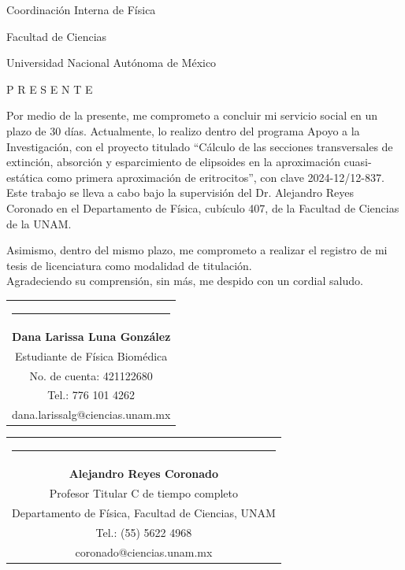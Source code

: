 \documentclass[9pt,letterpaper]{article}
\begin{document}
	Coordinación Interna de Física 
	
	Facultad de Ciencias
	
	Universidad Nacional Autónoma de México
	
	P R E S E N T E
	
	\vspace{0.5cm}
	
	
	Por medio de la presente, me comprometo a concluir mi servicio social en un plazo de 30 días. Actualmente, lo realizo dentro del programa Apoyo a la Investigación, con el proyecto titulado ``Cálculo de las secciones transversales de extinción, absorción y esparcimiento de elipsoides en la aproximación cuasi-estática como primera aproximación de eritrocitos'', con clave 2024-12/12-837. Este trabajo se lleva a cabo bajo la supervisión del Dr. Alejandro Reyes Coronado en el Departamento de Física, cubículo 407, de la Facultad de Ciencias de la UNAM.
	
	Asimismo, dentro del mismo plazo, me comprometo a realizar el registro de mi tesis de licenciatura como modalidad de titulación.\\
	
	\vspace{1cm}
	\noindent Agradeciendo su comprensión, sin más, me despido con un cordial saludo.
	
	{\vspace{2.55cm}\begin{tabular} { c}
			\setlength{\tabcolsep}{15pt}
			\renewcommand{\arraystretch}{1}
			\noindent\rule{5.5cm}{0.4pt}\qquad \\
			
			\qquad  \textbf{Dana Larissa Luna González} \qquad \\
			\qquad Estudiante de Física Biomédica  \qquad \\ \qquad 
			No. de cuenta: 421122680\qquad \\  
			\qquad  Tel.: 776 101 4262 \qquad \\
			\qquad dana.larissalg@ciencias.unam.mx \qquad \\
			
		\end{tabular}
	}
	
	{\vspace{-2.53cm}\hspace{7cm}\begin{tabular} { c}
			\setlength{\tabcolsep}{15pt}
			\renewcommand{\arraystretch}{1}
			\noindent\rule{5.5cm}{0.4pt}\qquad \\
			
			\qquad  \textbf{Alejandro Reyes Coronado} \qquad \\
			\qquad Profesor Titular C de tiempo completo  \qquad \\  
			\qquad Departamento de Física, Facultad de Ciencias, UNAM\qquad \\ 
			\qquad  Tel.: (55) 5622 4968 \qquad \\
			\qquad coronado@ciencias.unam.mx \qquad \\
			
		\end{tabular}
		
	}
	
	
	
	
	
	
	
	
	
\end{document}
